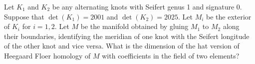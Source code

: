 Let $K_1$ and $K_2$ be any alternating knots with Seifert genus 1 and signature 0. Suppose that $\det(K_1)=2001$ and $\det(K_2)=2025$. Let $M_i$ be the exterior of $K_i$ for $i=1,2$. Let $M$ be the manifold obtained by gluing $M_1$ to $M_2$ along their boundaries, identifying the meridian of one knot with the Seifert longitude of the other knot and vice versa. What is the dimension of the hat version of Heegaard Floer homology of $M$ with coefficients in the field of two elements?
